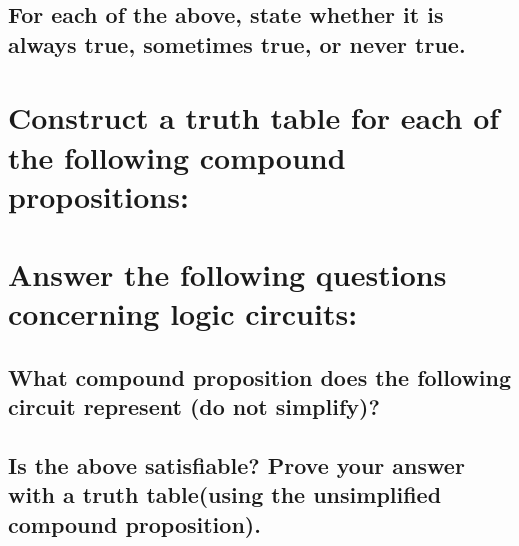 \documentclass{article}
\begin{document}
    \subsection{For each of the above, state whether it is always true, sometimes true, or never true.} 

\section{Construct a truth table for each of the following compound propositions:}
    \subsection{} 
    \subsection{} 

\section{Answer the following questions concerning logic circuits:}
    \subsection{What compound proposition does the following circuit represent (do not simplify)?} 
    \subsection{Is the above satisfiable? Prove your answer with a truth table(using the unsimplified compound proposition).} 
\end{document}
